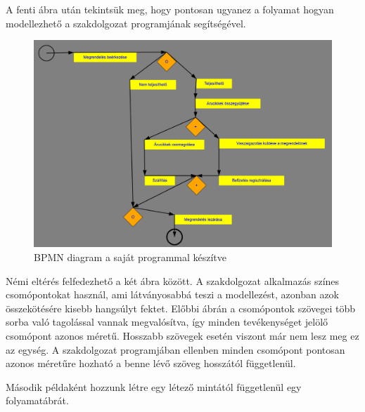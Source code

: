 A fenti ábra után tekintsük meg, hogy pontosan ugyanez a folyamat hogyan modellezhető a szakdolgozat programjának segítségével.

\begin{figure}[h]
\centering
\includegraphics[scale=0.45]{images/pelda1NEMVEGLEGES.png}
\caption{BPMN diagram a saját programmal készítve}
\label{fig:bpmn}
\end{figure}

Némi eltérés felfedezhető a két ábra között. A szakdolgozat alkalmazás színes csomópontokat használ, ami látványosabbá teszi a modellezést, azonban azok összekötésére kisebb hangsúlyt fektet. Előbbi ábrán a csomópontok szövegei több sorba való tagolással vannak megvalósítva, így minden tevékenységet jelölő csomópont azonos méretű. Hosszabb szövegek esetén viszont már nem lesz meg ez az egység. A szakdolgozat programjában ellenben minden csomópont pontosan azonos méretűre hozható a benne lévő szöveg hosszától függetlenül.


Második példaként hozzunk létre egy létező mintától függetlenül egy folyamatábrát.


